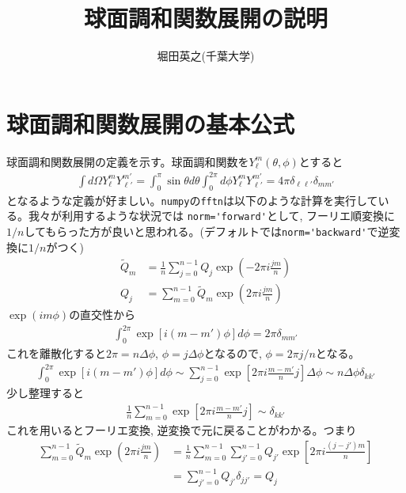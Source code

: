 \documentclass[a4j, 12pt]{ltjarticle}
\title{球面調和関数展開の説明}
\author{堀田英之(千葉大学)}
\begin{document}
    \maketitle
    \section{球面調和関数展開の基本公式}
    球面調和関数展開の定義を示す。球面調和関数を$Y_\ell^m(\theta,\phi)$とすると
    \begin{align}
        \int d\Omega Y_{\ell}^m Y_{\ell'}^{m'} = 
        \int_0^\pi \sin\theta d\theta\int_0^{2\pi} d\phi Y_{\ell}^m Y_{\ell'}^{m'} = 4\pi\delta_{\ell\ell'}\delta_{mm'}
    \end{align}
    となるような定義が好ましい。\verb|numpy|の\verb|fftn|は以下のような計算を実行している。我々が利用するような状況では
    \verb|norm='forward'|として, フーリエ順変換に$1/n$してもらった方が良いと思われる。(デフォルトでは\verb|norm='backward'|で逆変換に$1/n$がつく)
    \begin{align}
        \tilde{Q}_m &= \frac{1}{n}\sum_{j=0}^{n-1} Q_j \exp\left(-2\pi i \frac{jm}{n}\right) \\
        Q_j &= \sum_{m=0}^{n-1} \tilde{Q}_m \exp\left(2\pi i\frac{jm}{n}\right)
    \end{align}
    $\exp(im\phi)$の直交性から
    \begin{align}
        \int_0^{2\pi} \exp\left[ i(m-m')\phi\right] d\phi = 2\pi \delta_{mm'}
    \end{align}
    これを離散化すると$2\pi=n\Delta \phi$, $\phi=j\Delta \phi$となるので, $\phi=2\pi j/n$となる。
    \begin{align}
        \int_0^{2\pi} \exp\left[ i(m-m')\phi\right] d\phi \sim
        \sum_{j=0}^{n-1} \exp\left[2\pi i \frac{m-m'}{n}j\right] \Delta \phi 
        \sim n\Delta \phi \delta_{kk'}
    \end{align}
    少し整理すると
    \begin{align}
        \frac{1}{n}\sum_{m=0}^{n-1} \exp\left[2\pi i \frac{m-m'}{n}j\right] \sim \delta_{kk'}
    \end{align}
    これを用いるとフーリエ変換, 逆変換で元に戻ることがわかる。つまり
    \begin{align}
        \sum_{m=0}^{n-1} \tilde{Q}_m \exp\left(2\pi i \frac{jm}{n}\right)
        &= \frac{1}{n}\sum_{m=0}^{n-1} \sum_{j'=0}^{n-1}Q_{j'} \exp\left[2\pi i \frac{(j-j')m}{n}\right] \\
        &= \sum_{j'=0}^{n-1}Q_{j'}\delta_{jj'} = Q_j
    \end{align}
\end{document}
